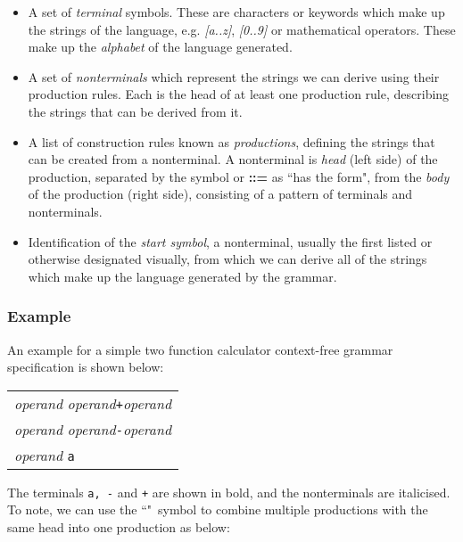 \documentclass[a4paper, 11pt]{article}
\begin{document}
\begin{itemize}
	\item A set of \textit{terminal} symbols. These are characters or keywords which make up the strings of the language, e.g. \textit{[a..z]}, \textit{[0..9]} or mathematical operators. These make up the \textit{alphabet} of the language generated.

	\item A set of \textit{nonterminals} which represent the strings we can derive using their production rules. Each is the head of at least one production rule, describing the strings that can be derived from it.

	\item A list of construction rules known as \textit{productions}, defining the strings that can be created from a nonterminal. A nonterminal is \textit{head} (left side) of the production, separated by the symbol \textbf{\textrightarrow} or \textbf{::=} as ``has the form", from the \textit{body} of the production (right side), consisting of a pattern of terminals and nonterminals.

	\item Identification of the \textit{start symbol}, a nonterminal, usually the first listed or otherwise designated visually, from which we can derive all of the strings which make up the language generated by the grammar.
\end{itemize}

\subsubsection{Example}
An example for a simple two function calculator context-free grammar specification is shown below:

\begin{center}
	\begin{tabular}{l}
		\textit{operand} \textbf{\textrightarrow} \textit{operand}\texttt{+}\textit{operand} \\
		\textit{operand} \textbf{\textrightarrow} \textit{operand}\texttt{-}\textit{operand} \\
		\textit{operand} \textbf{\textrightarrow} \texttt{a}
	\end{tabular}
\end{center}

The terminals \texttt{a, -} and \texttt{+} are shown in bold, and the nonterminals are italicised. To note, we can use the ``\textbar"\ symbol to combine multiple productions with the same head into one production as below:
\end{document}
